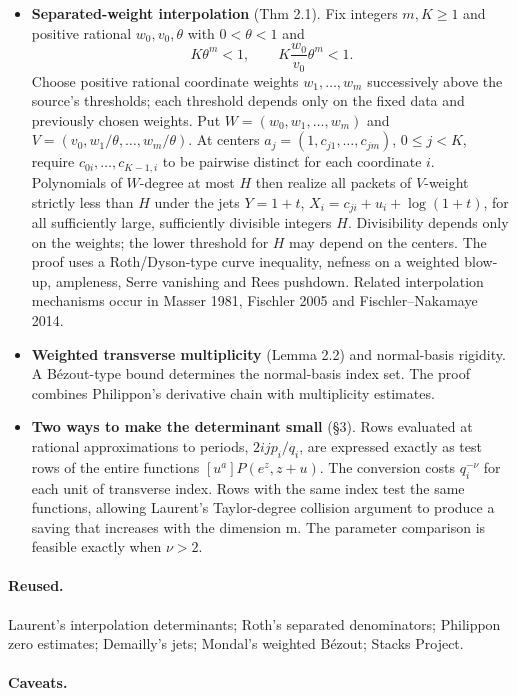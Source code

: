 \documentclass[11pt]{article}
\begin{document}
\begin{itemize}
\item \textbf{Separated-weight interpolation} (Thm 2.1). Fix integers $m,K\ge1$ and positive rational $w_0,v_0,\theta$ with $0<\theta<1$ and
\[
 K\theta^m<1,\qquad K\frac{w_0}{v_0}\theta^m<1.
\]
Choose positive rational coordinate weights $w_1,\ldots,w_m$ successively above the source's thresholds; each threshold depends only on the fixed data and previously chosen weights. Put $W=(w_0,w_1,\ldots,w_m)$ and $V=(v_0,w_1/\theta,\ldots,w_m/\theta)$. At centers $a_j=(1,c_{j1},\ldots,c_{jm})$, $0\le j<K$, require $c_{0i},\ldots,c_{K-1,i}$ to be pairwise distinct for each coordinate $i$. Polynomials of $W$-degree at most $H$ then realize all packets of $V$-weight strictly less than $H$ under the jets $Y=1+t$, $X_i=c_{ji}+u_i+\log(1+t)$, for all sufficiently large, sufficiently divisible integers $H$. Divisibility depends only on the weights; the lower threshold for $H$ may depend on the centers. The proof uses a Roth/Dyson-type curve inequality, nefness on a weighted blow-up, ampleness, Serre vanishing and Rees pushdown. Related interpolation mechanisms occur in Masser 1981, Fischler 2005 and Fischler--Nakamaye 2014.
\item \textbf{Weighted transverse multiplicity} (Lemma 2.2) and normal-basis rigidity. A B\'ezout-type bound determines the normal-basis index set. The proof combines Philippon's derivative chain with multiplicity estimates.
\item \textbf{Two ways to make the determinant small} (\S{}3). Rows evaluated at rational approximations to periods, $2ijp_i/q_i$, are expressed exactly as test rows of the entire functions $[u^a]P(e^z,z+u)$. The conversion costs $q_i^{-\nu}$ for each unit of transverse index. Rows with the same index test the same functions, allowing Laurent\textquoteright{}s Taylor-degree collision argument to produce a saving that increases with the dimension m. The parameter comparison is feasible exactly when $\nu>2$.
\end{itemize}

\paragraph{Reused.}

Laurent's interpolation determinants; Roth's separated denominators; Philippon zero estimates; Demailly's jets; Mondal's weighted Bézout; Stacks Project.

\paragraph{Caveats.}
\end{document}

